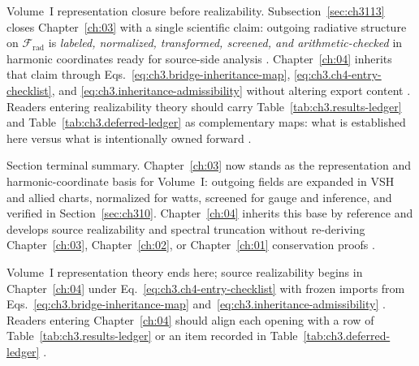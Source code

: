 Volume~I representation closure before realizability. Subsection~\ref{sec:ch3113} closes Chapter~\ref{ch:03} with a single scientific claim: outgoing radiative structure on \(\mathcal{F}_{\mathrm{rad}}\) is \emph{labeled, normalized, transformed, screened, and arithmetic-checked} in harmonic coordinates ready for source-side analysis
\cite{hansen1988}. Chapter~\ref{ch:04} inherits that claim through Eqs.~\eqref{eq:ch3.bridge-inheritance-map}, \eqref{eq:ch3.ch4-entry-checklist}, and \eqref{eq:ch3.inheritance-admissibility} without altering export content
\cite{devaney2004}. Readers entering realizability theory should carry Table~\ref{tab:ch3.results-ledger} and Table~\ref{tab:ch3.deferred-ledger} as complementary maps: what is established here versus what is intentionally owned forward
\cite{stratton1941}.

Section terminal summary. Chapter~\ref{ch:03} now stands as the representation and harmonic-coordinate basis for Volume~I: outgoing fields are expanded in
VSH and allied charts, normalized for watts, screened for gauge and inference, and verified in Section~\ref{sec:ch310}.
Chapter~\ref{ch:04} inherits this base by reference and develops source realizability and spectral truncation without
re-deriving Chapter~\ref{ch:03}, Chapter~\ref{ch:02}, or Chapter~\ref{ch:01} conservation proofs
\cite{stratton1941}.

Volume~I representation theory ends here; source realizability begins in Chapter~\ref{ch:04} under Eq.~\eqref{eq:ch3.ch4-entry-checklist} with frozen imports from Eqs.~\eqref{eq:ch3.bridge-inheritance-map} and~\eqref{eq:ch3.inheritance-admissibility}
\cite{harrington2001}. Readers entering Chapter~\ref{ch:04} should align each opening with a row of Table~\ref{tab:ch3.results-ledger} or an item recorded in Table~\ref{tab:ch3.deferred-ledger}
\cite{hansen1988}.





